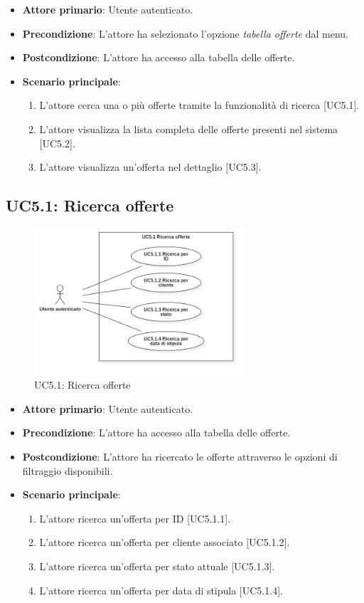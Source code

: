 \begin{itemize}
\item \textbf{Attore primario}: Utente autenticato.
\item \textbf{Precondizione}: L'attore ha selezionato l'opzione \textit{tabella offerte} dal menu.
\item \textbf{Postcondizione}: L'attore ha accesso alla tabella delle offerte.
\item \textbf{Scenario principale}: 
\begin{enumerate}
\item L'attore cerca una o più offerte tramite la funzionalità di ricerca [UC5.1].
\item L'attore visualizza la lista completa delle offerte presenti nel sistema [UC5.2].
\item L'attore visualizza un'offerta nel dettaglio [UC5.3].
\end{enumerate}
\end{itemize}

\pagebreak

\subsection{UC5.1: Ricerca offerte}
\begin{figure}[!h]
\centering
\includegraphics[width=300px]{../images/UC/.jpeg/UC5.1.0-ricercaOfferte.jpg}
\caption{UC5.1: Ricerca offerte}
\end{figure}

\begin{itemize}
\item \textbf{Attore primario}: Utente autenticato.
\item \textbf{Precondizione}: L'attore ha accesso alla tabella delle offerte.
\item \textbf{Postcondizione}: L'attore ha ricercato le offerte attraverso le opzioni di filtraggio disponibili.
\item \textbf{Scenario principale}: 
\begin{enumerate}
\item L'attore ricerca un'offerta per ID [UC5.1.1].
\item L'attore ricerca un'offerta per cliente associato [UC5.1.2].
\item L'attore ricerca un'offerta per stato attuale [UC5.1.3].
\item L'attore ricerca un'offerta per data di stipula [UC5.1.4].
\end{enumerate}
\end{itemize}

